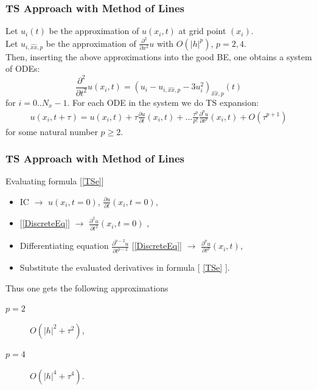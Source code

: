 \documentclass{beamer}
\newcommand{\be}{\begin{equation}}
\newcommand{\ee}{\end{equation}}
\begin{document}
\begin{frame}
\frametitle{TS Approach with Method of Lines}
Let $u_{i}(t)$ be the approximation of $u(x_i, t)$ at grid point $(x_i)$.
\\
Let $u_{i, \widehat{xx}, p}$ be the approximation of $\frac{\partial^2 }{\partial x^2} u$ with $O(|h|^p)$, $p=2,4$.
\\
Then, inserting the above approximations into the good BE, one obtains a system of ODEs:
\be \label{DiscreteEq}
\frac{\partial^2 }{\partial t^2}u(x_i, t)  =
(u_{i} - u_{i, \widehat{xx}, p} - 3u^2_{i})_{\widehat{xx}, p}(t)
\ee
for $i = 0..N_x-1$. For each ODE in the system we do TS expansion:
\begin{align} \label{TSe}
u(x_i, t+\tau) = u(x_i, t) + \tau \frac{ \partial u }{ \partial t }(x_i, t)  + ... 
\frac{ \tau^p }{ p! } \frac{ \partial^p u }{ \partial t^p }(x_i, t) + O(\tau^{p+1})
\end{align}
for some natural number $p \ge 2$.
\end{frame}


\begin{frame}
\frametitle{TS Approach with Method of Lines}
Evaluating formula [\ref{TSe}]
\begin{itemize}
 \item IC $\rightarrow$ $u(x_i, t=0)$, $\frac{ \partial u }{ \partial t }(x_i,  t=0)$,
 \item $[$\ref{DiscreteEq}$]$ $\rightarrow$ $\frac{ \partial^2 u }{ \partial t^2 }(x_i, t=0)$ ,
 \item Differentiating equation $\frac{ \partial^{p-2} u }{ \partial t^{p-2} }$ [\ref{DiscreteEq}] $\rightarrow$  $\frac{ \partial^p u }{ \partial t^p }(x_i, t)$,
 \item Substitute the evaluated derivatives in formula $[$ \ref{TSe} $]$.
\end{itemize}


Thus one gets the following approximations
\begin{description}
 \item[$p=2$] $O(|h|^2 + \tau^2)$,
 \item[$p=4$] $O(|h|^4 + \tau^4)$.
\end{description}
\end{frame}
\end{document}
